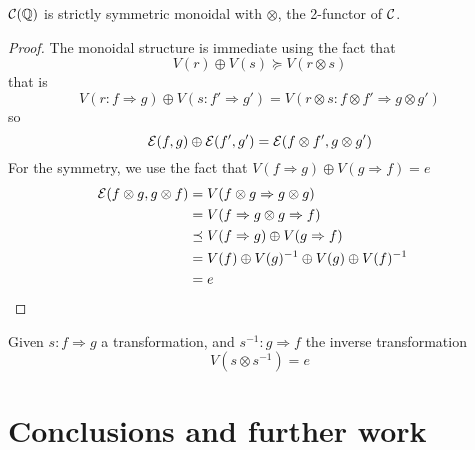 \documentclass[a4paper]{article}
\begin{document}
\begin{proposition}
${\cal C}(\mathbb{Q})$ is strictly symmetric monoidal with $\otimes$, the 2-functor of ${\cal C}$.

\begin{proof}
The monoidal structure is immediate using the fact that
\[
V(r) \oplus V(s) \succeq V(r \otimes s)
\]
that is
\[
V(r: f \Rightarrow g) \oplus V(s: f' \Rightarrow g') = V(r \otimes s: f \otimes f' \Rightarrow g \otimes g')
\]
so
\[
{\cal E}(f, g) \oplus {\cal E}(f', g') = {\cal E}(f \otimes f', g \otimes g')
\]
For the symmetry, we use the fact that $V(f \Rightarrow g) \oplus V(g \Rightarrow f) = e$
\begin{align}
{\cal E}(f \otimes g, g \otimes f) &= V(f \otimes g \Rightarrow g \otimes g) \cr
&= V(f \Rightarrow g \otimes g \Rightarrow f) \cr
&\preceq V(f \Rightarrow g) \oplus V(g \Rightarrow f) \cr
&= V(f) \oplus V(g)^{-1} \oplus V(g) \oplus V(f)^{-1} \cr
&= e
\end{align}
\end{proof}
\end{proposition}

\begin{corollary}
Given $s: f \Rightarrow g$ a transformation, and $s^{-1}: g \Rightarrow f$ the inverse transformation
\[
V(s \otimes s^{-1}) = e
\]
\end{corollary}


\section{Conclusions and further work}
\label{sec:conclusion}



\small

\end{document}

